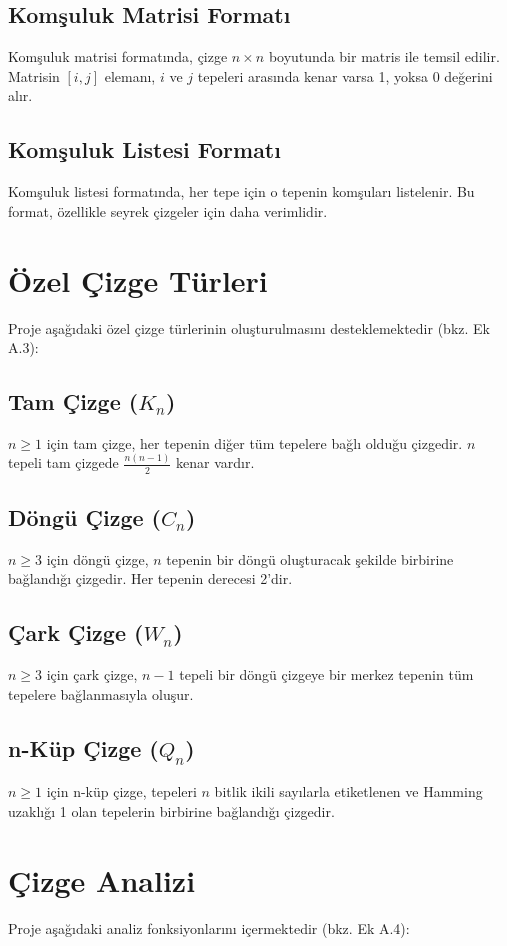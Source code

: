 \documentclass[12pt]{article}
\begin{document}
\subsection{Komşuluk Matrisi Formatı}
Komşuluk matrisi formatında, çizge $n \times n$ boyutunda bir matris ile temsil edilir. Matrisin $[i,j]$ elemanı, $i$ ve $j$ tepeleri arasında kenar varsa 1, yoksa 0 değerini alır.

\subsection{Komşuluk Listesi Formatı}
Komşuluk listesi formatında, her tepe için o tepenin komşuları listelenir. Bu format, özellikle seyrek çizgeler için daha verimlidir.

\section{Özel Çizge Türleri}
Proje aşağıdaki özel çizge türlerinin oluşturulmasını desteklemektedir (bkz. Ek A.3):

\subsection{Tam Çizge ($K_n$)}
$n \geq 1$ için tam çizge, her tepenin diğer tüm tepelere bağlı olduğu çizgedir. $n$ tepeli tam çizgede $\frac{n(n-1)}{2}$ kenar vardır.

\subsection{Döngü Çizge ($C_n$)}
$n \geq 3$ için döngü çizge, $n$ tepenin bir döngü oluşturacak şekilde birbirine bağlandığı çizgedir. Her tepenin derecesi 2'dir.

\subsection{Çark Çizge ($W_n$)}
$n \geq 3$ için çark çizge, $n-1$ tepeli bir döngü çizgeye bir merkez tepenin tüm tepelere bağlanmasıyla oluşur.

\subsection{n-Küp Çizge ($Q_n$)}
$n \geq 1$ için n-küp çizge, tepeleri $n$ bitlik ikili sayılarla etiketlenen ve Hamming uzaklığı 1 olan tepelerin birbirine bağlandığı çizgedir.

\section{Çizge Analizi}
Proje aşağıdaki analiz fonksiyonlarını içermektedir (bkz. Ek A.4):
\end{document}
